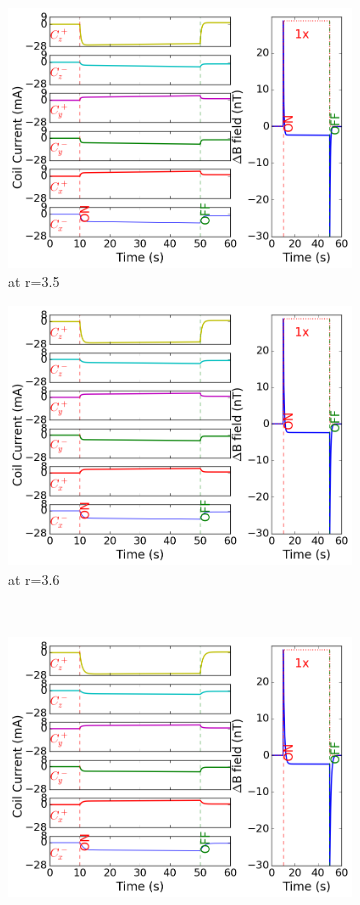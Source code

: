 \begin{figure}[!htb]
    \begin{subfigure}{.5\linewidth}
        \centering
        \includegraphics[width=\linewidth, height= 6.5 cm]{Images/r35}
        \caption{at r=3.5}
        \label{fig:r35}
    \end{subfigure}%
    \begin{subfigure}{.5\linewidth}
        \centering
        \includegraphics[width=\linewidth, height= 6.5 cm]{Images/r36}
        \caption{at r=3.6}
        \label{fig:r36}
    \end{subfigure}\\[1ex]
    \begin{subfigure}{.5\linewidth}
        \centering
        \includegraphics[width=\linewidth, height= 6.5 cm]{Images/r37}

\end{subfigure}
\end{figure}
